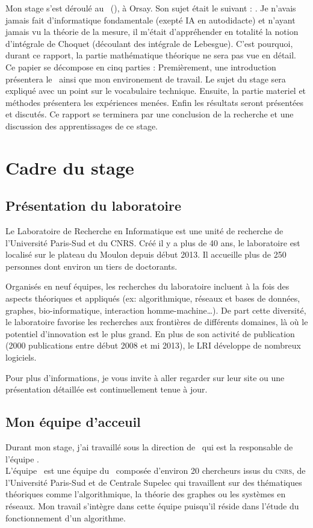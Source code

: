 
Mon stage s'est déroulé au \Lri\ (\lri), à Orsay.
Son sujet était le suivant : \textit{\sujet}.
Je n'avais jamais fait d'informatique fondamentale (exepté IA en autodidacte)
et n'ayant jamais vu la théorie de la mesure,
il m'était d'appréhender en totalité la notion d'intégrale de Choquet (découlant des intégrale de Lebesgue).
C'est pourquoi, durant ce rapport, la partie mathématique théorique ne sera pas vue en détail.\\


Ce papier se décompose en cinq parties :
Premièrement, une introduction présentera le \lri\ ainsi que mon environement de travail.
Le sujet du stage sera expliqué avec un point sur le vocabulaire technique.
Ensuite, la partie materiel et méthodes présentera les expériences menées.
Enfin les résultats seront présentées et discutés.
Ce rapport se terminera par une conclusion de la recherche et une discussion des apprentissages de ce stage.


\section{Cadre du stage}\label{sec:cadre-du-stage}
\subsection{Présentation du laboratoire}\label{subsec:pglri}
Le Laboratoire de Recherche en Informatique est une unité de recherche de l'Université
Paris-Sud et du \textsc{CNRS}.
Créé il y a plus de 40 ans, le laboratoire est localisé sur le plateau du Moulon depuis début 2013.
Il accueille plus de 250 personnes dont environ un tiers de doctorants.


Organisés en neuf équipes, les recherches du laboratoire incluent à la fois des aspects théoriques et appliqués
(ex: algorithmique, réseaux et bases de données, graphes, bio-informatique, interaction homme-machine\ldots).
De part cette diversité, le laboratoire favorise les recherches aux frontières de différents domaines,
là où le potentiel d'innovation est le plus grand.
En plus de son activité de publication (2000 publications entre début 2008 et mi 2013),
le LRI développe de nombreux logiciels.


Pour plus d'informations, je vous invite à aller regarder sur leur site
ou une présentation détaillée est continuellement tenue à jour\cite{LRI}.


\subsection{Mon équipe d'acceuil}\label{subsec:galac}
Durant mon stage, j'ai travaillé sous la direction de \johanne\ qui est la responsable de l'équipe \galac. \\
L'équipe \galac\ est une équipe du \lri\ composée d'environ 20 chercheurs issus du \textsc{cnrs}, de l'Université
Paris-Sud et de Centrale Supelec qui travaillent sur des thématiques théoriques comme
l'algorithmique, la théorie des graphes ou les systèmes en réseaux.
Mon travail s'intègre dans cette équipe puisqu'il réside dans l'étude du fonctionnement d'un algorithme.
